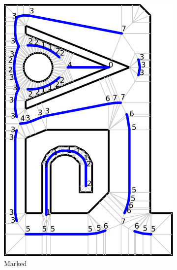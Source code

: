 \begin{figure}
\begin{subfigure}{\figwidth}
\includegraphics[width=\columnwidth]{sources/method/overview/marked.pdf}
\caption{Marked}\label{overview_fig_marked}
\end{subfigure}
\begin{subfigure}{\figwidth}
\centering

\end{subfigure}
\end{figure}
